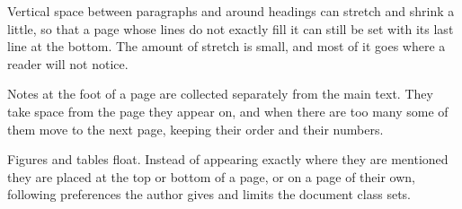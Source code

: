 \documentclass{article}
\begin{document}
Vertical space between paragraphs and around headings can stretch and shrink a little, so that a page whose lines do not exactly fill it can still be set with its last line at the bottom. The amount of stretch is small, and most of it goes where a reader will not notice.

Notes at the foot of a page are collected separately from the main text. They take space from the page they appear on, and when there are too many some of them move to the next page, keeping their order and their numbers.

Figures and tables float. Instead of appearing exactly where they are mentioned they are placed at the top or bottom of a page, or on a page of their own, following preferences the author gives and limits the document class sets.
\end{document}
